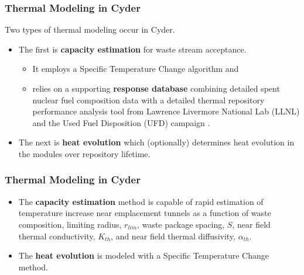 \begin{frame}[ctb!]
\frametitle{Thermal Modeling in Cyder}
Two types of thermal modeling occur in Cyder. 
\begin{itemize}
\item The first is \textbf{capacity estimation} for waste stream acceptance.
\begin{itemize}
\item It employs a Specific Temperature Change algorithm \cite{radel_effect_2007, radel_repository_2007} and
\item relies on a supporting \textbf{response database} combining detailed 
spent nuclear fuel composition data \cite{carter_fuel_2011} with a detailed 
thermal repository performance analysis tool from Lawrence Livermore National 
Lab (LLNL) and the Used Fuel Disposition (UFD) 
campaign \cite{greenberg_application_2012}.  
\end{itemize}
\item The next is \textbf{heat evolution} which (optionally) determines heat evolution in 
the modules over repository lifetime.
\end{itemize}
\end{frame}


\begin{frame}[ctb!]
\frametitle{Thermal Modeling in Cyder}
\begin{itemize}
\item The \textbf{capacity estimation} method is capable of rapid estimation of 
temperature increase near emplacement tunnels as a function of waste 
composition, limiting radius, $r_{lim}$, waste package spacing, $S$, near field 
thermal conductivity, $K_{th}$, and near field thermal diffusivity, 
$\alpha_{th}$.

\item The \textbf{heat evolution} is modeled with a Specific Temperature Change method.
\end{itemize}

\end{frame}



